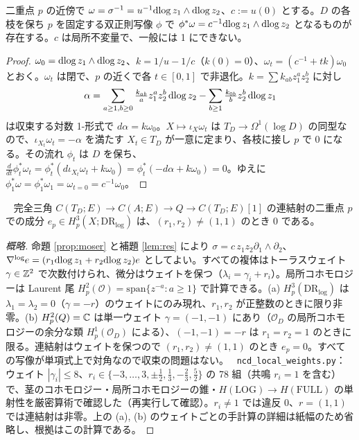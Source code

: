 \begin{prop}\tP\label{prop:moser}
二重点 $p$ の近傍で $\omega=\sigma^{-1}=u^{-1}\mathrm{dlog}\, z_1\wedge\mathrm{dlog}\, z_2$、$c:=u(0)$ とする。$D$ の各枝を保ち $p$ を固定する双正則写像 $\phi$ で $\phi^*\omega=c^{-1}\mathrm{dlog}\, z_1\wedge\mathrm{dlog}\, z_2$ となるものが存在する。$c$ は局所不変量で、一般には 1 にできない。
\end{prop}
\begin{proof}
$\omega_0=\mathrm{dlog}\, z_1\wedge\mathrm{dlog}\, z_2$、$k=1/u-1/c$（$k(0)=0$）、$\omega_t=(c^{-1}+tk)\omega_0$ とおく。$\omega_t$ は閉で、$p$ の近くで各 $t\in[0,1]$ で非退化。$k=\sum k_{ab}z_1^az_2^b$ に対し
\[\alpha=\sum_{a\ge1,b\ge0}\tfrac{k_{ab}}{a}z_1^az_2^b\,\mathrm{dlog}\, z_2-\sum_{b\ge1}\tfrac{k_{0b}}{b}z_2^b\,\mathrm{dlog}\, z_1\]
は収束する対数 1-形式で $d\alpha=k\omega_0$。$X\mapsto\iota_X\omega_t$ は $T_D\to\Omega^1(\log D)$ の同型なので、$\iota_{X_t}\omega_t=-\alpha$ を満たす $X_t\in T_D$ が一意に定まり、各枝に接し $p$ で 0 になる。その流れ $\phi_t$ は $D$ を保ち、$\tfrac d{dt}\phi_t^*\omega_t=\phi_t^*(d\iota_{X_t}\omega_t+k\omega_0)=\phi_t^*(-d\alpha+k\omega_0)=0$。ゆえに $\phi_1^*\omega=\phi_1^*\omega_1=\omega_{t=0}=c^{-1}\omega_0$。\qedhere
\end{proof}
\begin{lem}[連結射の消滅]\tP\ \tV\label{lem:conn}
完全三角 $C(T_D;E)\to C(A;E)\to Q\to C(T_D;E)[1]$ の連結射の二重点 $p$ での成分 $e_p\in H^3_p(X;\mathrm{DR}_{\log})$ は、$(r_1,r_2)\ne(1,1)$ のとき 0 である。
\end{lem}
\begin{proof}[概略]
命題 \ref{prop:moser} と補題 \ref{lem:res} により $\sigma=c\,z_1z_2\partial_1\wedge\partial_2$、$\nabla^{\log}e=(r_1\mathrm{dlog}\, z_1+r_2\mathrm{dlog}\, z_2)e$ としてよい。すべての複体はトーラスウェイト $\gamma\in\mathbb Z^2$ で次数付けられ、微分はウェイトを保つ（$\lambda_i=\gamma_i+r_i$）。局所コホモロジーは Laurent 尾 $H^2_p(\mathcal O)=\mathrm{span}\{z^{-a}:a\ge1\}$ で計算できる。(a) $H^3_p(\mathrm{DR}_{\log})$ は $\lambda_1=\lambda_2=0$（$\gamma=-r$）のウェイトにのみ現れ、$r_1,r_2$ が正整数のときに限り非零。(b) $H^2_p(Q)=\mathbb C$ は単一ウェイト $\gamma=(-1,-1)$ にあり（$\mathcal O_D$ の局所コホモロジーの余分な類 $H^1_p(\mathcal O_D)$ による）、$(-1,-1)=-r$ は $r_1=r_2=1$ のときに限る。連結射はウェイトを保つので $(r_1,r_2)\ne(1,1)$ のとき $e_p=0$。すべての写像が単項式上で対角なので収束の問題はない。
\tV\ \texttt{ncd\_local\_weights.py}：ウェイト $|\gamma_i|\le8$、$r_i\in\{-3,\dots,3,\pm\tfrac12,\tfrac13,-\tfrac23,\tfrac52\}$ の 78 組（共鳴 $r_i=1$ を含む）で、茎のコホモロジー・局所コホモロジーの錐・$H(\mathrm{LOG})\to H(\mathrm{FULL})$ の単射性を厳密算術で確認した（再実行して確認）。$r_i\neq1$ では違反 0、$r=(1,1)$ では連結射は非零。上の (a), (b) のウェイトごとの手計算の詳細は紙幅のため省略し、根拠はこの計算である。\qedhere
\end{proof}
